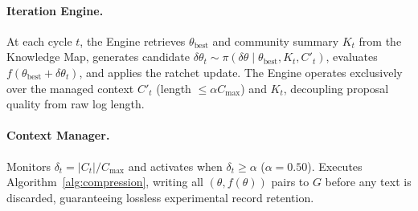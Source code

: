 \documentclass[conference]{IEEEtran}
\newcommand{\dlt}{\delta_t}
\newcommand{\Cmax}{C_{\max}}
\newcommand{\tbest}{\theta_{\mathrm{best}}}
\newcommand{\Kt}{K_t}
\newcommand{\Ct}{C_t}
\newcommand{\CtPrime}{C'_t}
\begin{document}
\paragraph{Iteration Engine.}
At each cycle $t$, the Engine retrieves $\tbest$ and community summary $\Kt$ from the Knowledge Map, generates candidate $\delta\theta_t \sim \pi(\delta\theta \mid \tbest, \Kt, \CtPrime)$, evaluates $f(\tbest + \delta\theta_t)$, and applies the ratchet update. The Engine operates exclusively over the managed context $\CtPrime$ (length $\leq \alpha\Cmax$) and $\Kt$, decoupling proposal quality from raw log length.

\paragraph{Context Manager.}
Monitors $\dlt = |\Ct|/\Cmax$ and activates when $\dlt \geq \alpha$ ($\alpha{=}0.50$). Executes Algorithm~\ref{alg:compression}, writing all $(\theta, f(\theta))$ pairs to $G$ before any text is discarded, guaranteeing lossless experimental record retention.
\end{document}
